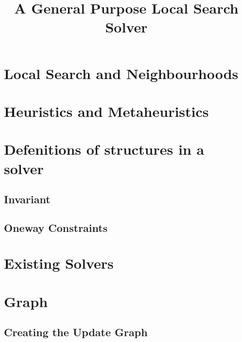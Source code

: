 \documentclass[a4paper,10pt]{article}
\title{A General Purpose Local Search Solver}
\begin{document}
\maketitle

\section{Local Search and Neighbourhoods}
\section{Heuristics and Metaheuristics}
\section{Defenitions of structures in a solver}

\subsection{Invariant}

\subsection{Oneway Constraints}

\section{Existing Solvers}



\section{Graph}

\newpage
\subsection{Creating the Update Graph} \label{updategraph}

\newpage
%
\end{document}
